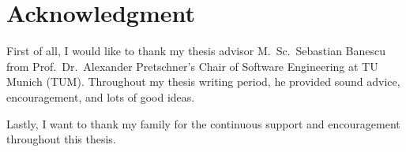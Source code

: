 \newpage
\thispagestyle{empty}
\section*{Acknowledgment}
First of all, I would like to thank my thesis advisor M.~Sc.~Sebastian Banescu from Prof.~Dr.~Alexander Pretschner's Chair of Software Engineering at TU Munich (TUM). Throughout my thesis writing period, he provided sound advice, encouragement, and lots of good ideas.

\bigskip

Lastly, I want to thank my family for the continuous support and encouragement throughout this thesis.